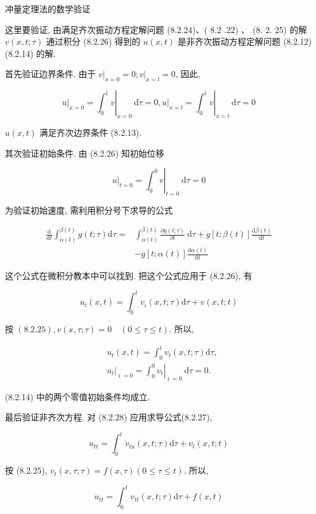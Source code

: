 冲量定理法的数学验证

这里要验证, 由满足齐次振动方程定解问题 (8.2.24)、( 8.2 .22$)$ 、 (8. 2. 25) 的解 $v(x, t ; \tau)$ 通过积分 (8.2.26) 得到的 $u(x, t)$ 是非齐次振动方程定解问题 (8.2.12) (8.2.14) 的解.

首先验证边界条件. 由于 $\left.v\right|_{x=0}=0 ;\left.v\right|_{x=l}=0$, 因此,

$$
\left.u\right|_{x=0}=\left.\int_{0}^{t} v\right|_{x=0} \mathrm{~d} \tau=0,\left.u\right|_{x=l}=\left.\int_{0}^{t} v\right|_{x=l} \mathrm{~d} \tau=0
$$

$u(x, t)$ 满足齐次边界条件 (8.2.13).

其次验证初始条件. 由 (8.2.26) 知初始位移

$$
\left.u\right|_{t=0}=\left.\int_{0}^{0} v\right|_{t=0} \mathrm{~d} \tau=0
$$

为验证初始速度, 需利用积分号下求导的公式

$$
\begin{aligned}
\frac{\mathrm{d}}{\mathrm{d} t} \int_{\alpha(t)}^{\beta(t)} g(t ; \tau) \mathrm{d} \tau= & \int_{\alpha(t)}^{\beta(t)} \frac{\partial g(t ; \tau)}{\partial t} \mathrm{~d} \tau+g[t ; \beta(t)] \frac{\mathrm{d} \beta(t)}{\mathrm{d} t} \\
& -g[t ; \alpha(t)] \frac{\mathrm{d} \alpha(t)}{\mathrm{d} t}
\end{aligned}
$$

这个公式在微积分教本中可以找到. 把这个公式应用于 (8.2.26), 有

$$
u_{t}(x, t)=\int_{0}^{t} v_{\iota}(x, t ; \tau) \mathrm{d} \tau+v(x, t ; t)
$$

按 $(8.2 .25), v(x, \tau ; \tau)=0 \quad(0 \leqslant \tau \leqslant t)$. 所以,

$$
\begin{aligned}
& u_{t}(x, t)=\int_{0}^{t} v_{t}(x, t ; \tau) \mathrm{d} \tau, \\
& \left.u_{t}\right|_{\imath=0}=\left.\int_{0}^{0} v_{t}\right|_{\imath=0} \mathrm{~d} \tau=0 .
\end{aligned}
$$

(8.2.14) 中的两个零值初始条件均成立.

最后验证非齐次方程. 对 (8.2.28) 应用求导公式(8.2.27),

$$
u_{t t}=\int_{0}^{t} \dot{v}_{t u}(x, t ; \tau) \mathrm{d} \tau+v_{t}(x, t ; t)
$$

按 (8.2.25), $v_{t}(x, \tau ; \tau)=f(x, \tau)(0 \leqslant \tau \leqslant t)$. 所以,

$$
u_{t t}=\int_{0}^{t} v_{t t}(x, t ; \tau) \mathrm{d} \tau+f(x, t)
$$

